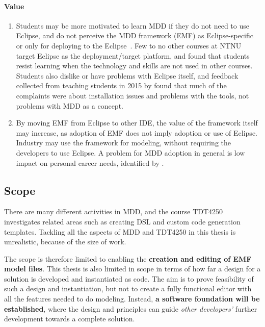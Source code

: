 \paragraph{Value}
\begin{enumerate}
  \item Students may be more motivated to learn \acrshort{MDD} if they do not need to use \gls{Eclipse}, and do not perceive the \acrshort{MDD} framework (\acrshort{EMF}) as \gls{Eclipse}-specific or only for deploying to the \gls{Eclipse}~\cite[p.~2]{rekstadModelingEnvironmentCloud2020}.
  Few to no other courses at \acrshort{NTNU} target \gls{Eclipse} as the deployment/target platform, and \textcite{kuzniarzTeachingModelDrivenSoftware2016} found that students resist learning when the technology and skills are not used in other courses.
  Students also dislike or have problems with \gls{Eclipse} itself, and feedback collected from teaching students in 2015 by \textcite{jordicabotFailedConvinceMy2015} found that much of the complaints were about installation issues and problems with the tools, not problems with \acrshort{MDD} as a concept.
  
  \item By moving \acrshort{EMF} from \gls{Eclipse} to other \gls{IDE}, the value of the framework itself may increase, as adoption of \acrshort{EMF} does not imply adoption or use of \gls{Eclipse}.
  Industry may use the framework for modeling, without requiring the developers to use \gls{Eclipse}.
  A problem for \acrshort{MDD} adoption in general is low impact on personal career needs, identified by \textcite{jonwhittleTaxonomyToolrelatedIssues2015}.
\end{enumerate}

\subsection{Scope}

There are many different activities in \acrshort{MDD}, and the course \gls{TDT4250} investigates related areas such as creating \acrfull{DSL} and custom code generation templates.
Tackling all the aspects of \acrshort{MDD} and \gls{TDT4250} in this thesis is unrealistic, because of the size of work.

The scope is therefore limited to enabling the \textbf{creation and editing of  \acrshort{EMF} model files}.
This thesis is also limited in scope in terms of how far a design for a solution is developed and instantiated as code.
The aim is to prove feasibility of such a design and instantiation, but not to create a fully functional editor with all the features needed to do modeling.
Instead, \textbf{a software foundation will be established}, where the design and principles can guide \textit{other developers'} further development towards a complete solution.

